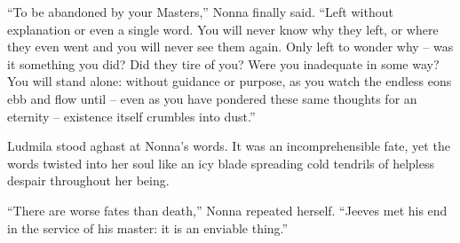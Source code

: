  

“To be abandoned by your Masters,” Nonna finally said. “Left without explanation or even a single word. You will never know why they left, or where they even went and you will never see them again. Only left to wonder why – was it something you did? Did they tire of you? Were you inadequate in some way? You will stand alone: without guidance or purpose, as you watch the endless eons ebb and flow until – even as you have pondered these same thoughts for an eternity – existence itself crumbles into dust.”

 

Ludmila stood aghast at Nonna’s words. It was an incomprehensible fate, yet the words twisted into her soul like an icy blade spreading cold tendrils of helpless despair throughout her being.

 

“There are worse fates than death,” Nonna repeated herself. “Jeeves met his end in the service of his master: it is an enviable thing.”